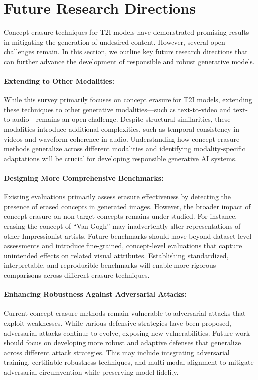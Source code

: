 

\section{Future Research Directions} \label{sec:future_research}

Concept erasure techniques for T2I models have demonstrated promising results in mitigating the generation of undesired content. However, several open challenges remain. In this section, we outline key future research directions that can further advance the development of responsible and robust generative models.

\paragraph{Extending to Other Modalities:} While this survey primarily focuses on concept erasure for T2I models, extending these techniques to other generative modalities—such as text-to-video and text-to-audio—remains an open challenge. Despite structural similarities, these modalities introduce additional complexities, such as temporal consistency in videos and waveform coherence in audio. Understanding how concept erasure methods generalize across different modalities and identifying modality-specific adaptations will be crucial for developing responsible generative AI systems.

\paragraph{Designing More Comprehensive Benchmarks:} Existing evaluations primarily assess erasure effectiveness by detecting the presence of erased concepts in generated images. However, the broader impact of concept erasure on non-target concepts remains under-studied. For instance, erasing the concept of ``Van Gogh'' may inadvertently alter representations of other Impressionist artists. Future benchmarks should move beyond dataset-level assessments and introduce fine-grained, concept-level evaluations that capture unintended effects on related visual attributes. Establishing standardized, interpretable, and reproducible benchmarks will enable more rigorous comparisons across different erasure techniques.

\paragraph{Enhancing Robustness Against Adversarial Attacks:} Current concept erasure methods remain vulnerable to adversarial attacks that exploit weaknesses. While various defensive strategies have been proposed, adversarial attacks continue to evolve, exposing new vulnerabilities. Future work should focus on developing more robust and adaptive defenses that generalize across different attack strategies. This may include integrating adversarial training, certifiable robustness techniques, and multi-modal alignment to mitigate adversarial circumvention while preserving model fidelity.

